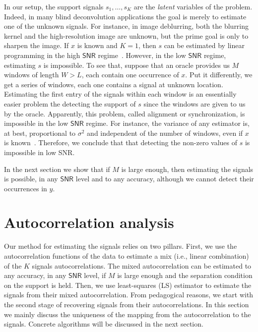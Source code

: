 \documentclass[english]{article}
\numberwithin{equation}{section}
\theoremstyle{plain}
\theoremstyle{definition}
\theoremstyle{remark}
\theoremstyle{plain}
\theoremstyle{remark}
\theoremstyle{plain}
\theoremstyle{plain}
\newcommand{\SNR}{{\textsf{SNR}}}
\begin{document}
In our setup, the support signals $s_1,\ldots,s_K$ are the \emph{latent} variables of the problem. Indeed, in many blind deconvolution applications the goal is merely to estimate one of the unknown signals. For instance, in image deblurring, both the blurring
kernel and the high-resolution image are unknown, but the prime goal is only
to sharpen the image.
If $x$ is known and $K=1$, then  $s$ can be estimated by linear programming  in the high $\SNR$ regime~\cite{de2012exact,duval2015exact,bendory2016robust,bendory2017robust,bernstein2017deconvolution}. However, in the low $\SNR$ regime, estimating $s$ is impossible. To see that, suppose that an oracle provides us $M$ windows of length $W>L$, each contain one occurrence of $x$. Put it differently, we get a series of windows, each one contains a signal at unknown location.
Estimating the first entry of the signals within each  window is an essentially easier problem the detecting the support of $s$ since the windows are given to us by the oracle. Apparently, this problem, called alignment or synchronization, is impossible in the low $\SNR$ regime.
For instance, the variance of any estimator is, at best, proportional to $\sigma^2$ and independent of the number of windows, even if $x$ is known~\cite{aguerrebere2016fundamental}. Therefore, we conclude that that detecting the non-zero values of $s$ is impossible in low \SNR. 

In the next section we show that if $M$ is large enough, then estimating the signals is possible, in any $\SNR$ level and to any accuracy, although we cannot detect their occurrences in $y$. 



\section{Autocorrelation analysis}   \label{sec:autocorrelation}

Our method for estimating the signals relies on two pillars. 
First, we use the autocorrelation functions of the data to estimate a mix (i.e., linear combination) of the $K$ signals autocorrelations. The mixed autocorrelation can be estimated to any accuracy, in any $\SNR$ level, if $M$ is large enough and the separation condition on the support is held. Then, we use least-squares (LS) estimator to estimate the signals from their mixed autocorrelation. From pedagogical reasons, we start with the second stage of recovering signals from their autocorrelations. In this section we mainly discuss the uniqueness of the mapping from the autocorrelation to the signals. Concrete algorithms will be discussed in the next section.
\end{document}

